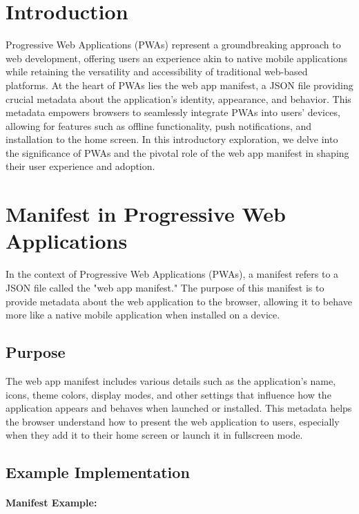 \documentclass[12pt,a4paper]{article}
\begin{document}
\section{Introduction}

Progressive Web Applications (PWAs) represent a groundbreaking approach to web development, offering users an experience akin to native mobile applications while retaining the versatility and accessibility of traditional web-based platforms. At the heart of PWAs lies the web app manifest, a JSON file providing crucial metadata about the application's identity, appearance, and behavior. This metadata empowers browsers to seamlessly integrate PWAs into users' devices, allowing for features such as offline functionality, push notifications, and installation to the home screen. In this introductory exploration, we delve into the significance of PWAs and the pivotal role of the web app manifest in shaping their user experience and adoption.
	
\section{Manifest in Progressive Web Applications}

In the context of Progressive Web Applications (PWAs), a manifest refers to a JSON file called the "web app manifest." The purpose of this manifest is to provide metadata about the web application to the browser, allowing it to behave more like a native mobile application when installed on a device.

\subsection{Purpose}

The web app manifest includes various details such as the application's name, icons, theme colors, display modes, and other settings that influence how the application appears and behaves when launched or installed. This metadata helps the browser understand how to present the web application to users, especially when they add it to their home screen or launch it in fullscreen mode.

\subsection{Example Implementation}

\paragraph{Manifest Example:}
\end{document}
